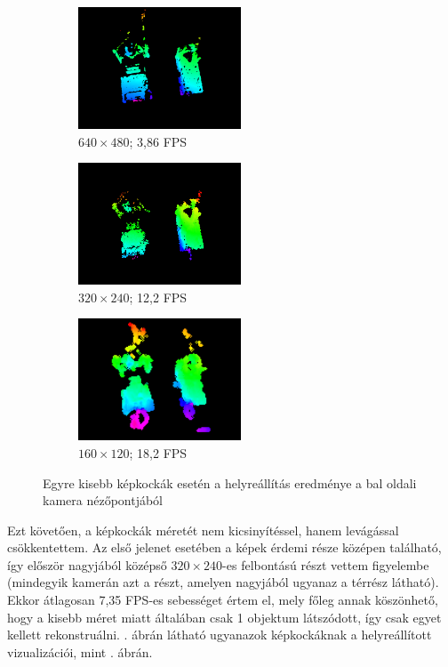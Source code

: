\begin{figure}[tbh]
\centering
\begin{subfigure}[b]{.32\linewidth}
	\centering
	\includegraphics[width=137pt]{figures/vis_127_640.png}
	\caption{$640\times 480$; 3,86 FPS}
  \end{subfigure}
\begin{subfigure}[b]{.32\linewidth}
	\centering
	\includegraphics[width=137pt]{figures/vis_127_320.png}
	\caption{$320\times 240$; 12,2 FPS}
  \end{subfigure}
\begin{subfigure}[b]{.32\linewidth}
	\centering
	\includegraphics[width=137pt]{figures/vis_127_160.png}
	\caption{$160\times 120$; 18,2 FPS}
  \end{subfigure}
\caption{Egyre kisebb képkockák esetén a helyreállítás eredménye a bal oldali kamera nézőpontjából \label{fig:resize}}
\end{figure}

Ezt követően, a képkockák méretét nem kicsinyítéssel, hanem levágással csökkentettem. Az első jelenet esetében a képek érdemi része középen található, így először nagyjából középső $320\times 240$-es felbontású részt vettem figyelembe (mindegyik kamerán azt a részt, amelyen nagyjából ugyanaz a térrész látható). Ekkor átlagosan 7,35 FPS-es sebességet értem el, mely főleg annak köszönhető, hogy a kisebb méret miatt általában csak 1 objektum látszódott, így csak egyet kellett rekonstruálni. . ábrán látható ugyanazok képkockáknak a helyreállított vizualizációi, mint . ábrán.

